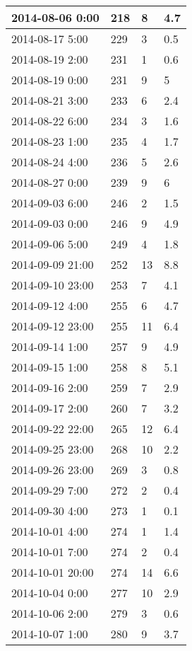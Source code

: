 \documentclass[
]{article}
\begin{document}
\begin{tabular}{l|l|l|l}
\hline
2014-08-06 0:00 & 218 & 8 & 4.7\\
\hline
2014-08-17 5:00 & 229 & 3 & 0.5\\
\hline
2014-08-19 2:00 & 231 & 1 & 0.6\\
\hline
2014-08-19 0:00 & 231 & 9 & 5\\
\hline
2014-08-21 3:00 & 233 & 6 & 2.4\\
\hline
2014-08-22 6:00 & 234 & 3 & 1.6\\
\hline
2014-08-23 1:00 & 235 & 4 & 1.7\\
\hline
2014-08-24 4:00 & 236 & 5 & 2.6\\
\hline
2014-08-27 0:00 & 239 & 9 & 6\\
\hline
2014-09-03 6:00 & 246 & 2 & 1.5\\
\hline
2014-09-03 0:00 & 246 & 9 & 4.9\\
\hline
2014-09-06 5:00 & 249 & 4 & 1.8\\
\hline
2014-09-09 21:00 & 252 & 13 & 8.8\\
\hline
2014-09-10 23:00 & 253 & 7 & 4.1\\
\hline
2014-09-12 4:00 & 255 & 6 & 4.7\\
\hline
2014-09-12 23:00 & 255 & 11 & 6.4\\
\hline
2014-09-14 1:00 & 257 & 9 & 4.9\\
\hline
2014-09-15 1:00 & 258 & 8 & 5.1\\
\hline
2014-09-16 2:00 & 259 & 7 & 2.9\\
\hline
2014-09-17 2:00 & 260 & 7 & 3.2\\
\hline
2014-09-22 22:00 & 265 & 12 & 6.4\\
\hline
2014-09-25 23:00 & 268 & 10 & 2.2\\
\hline
2014-09-26 23:00 & 269 & 3 & 0.8\\
\hline
2014-09-29 7:00 & 272 & 2 & 0.4\\
\hline
2014-09-30 4:00 & 273 & 1 & 0.1\\
\hline
2014-10-01 4:00 & 274 & 1 & 1.4\\
\hline
2014-10-01 7:00 & 274 & 2 & 0.4\\
\hline
2014-10-01 20:00 & 274 & 14 & 6.6\\
\hline
2014-10-04 0:00 & 277 & 10 & 2.9\\
\hline
2014-10-06 2:00 & 279 & 3 & 0.6\\
\hline
2014-10-07 1:00 & 280 & 9 & 3.7\\
\hline
\end{tabular}
\end{document}
